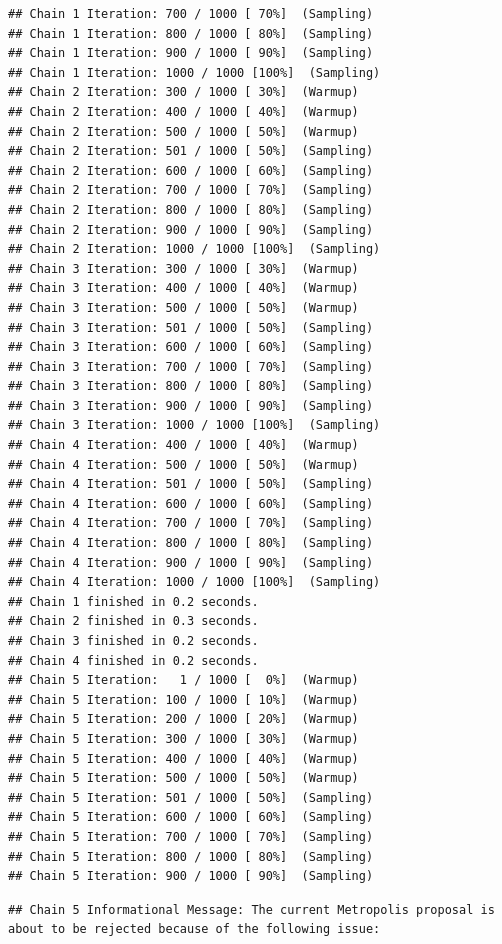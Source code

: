 \documentclass[
]{book}
\begin{document}
\begin{verbatim}
## Chain 1 Iteration: 700 / 1000 [ 70%]  (Sampling) 
## Chain 1 Iteration: 800 / 1000 [ 80%]  (Sampling) 
## Chain 1 Iteration: 900 / 1000 [ 90%]  (Sampling) 
## Chain 1 Iteration: 1000 / 1000 [100%]  (Sampling) 
## Chain 2 Iteration: 300 / 1000 [ 30%]  (Warmup) 
## Chain 2 Iteration: 400 / 1000 [ 40%]  (Warmup) 
## Chain 2 Iteration: 500 / 1000 [ 50%]  (Warmup) 
## Chain 2 Iteration: 501 / 1000 [ 50%]  (Sampling) 
## Chain 2 Iteration: 600 / 1000 [ 60%]  (Sampling) 
## Chain 2 Iteration: 700 / 1000 [ 70%]  (Sampling) 
## Chain 2 Iteration: 800 / 1000 [ 80%]  (Sampling) 
## Chain 2 Iteration: 900 / 1000 [ 90%]  (Sampling) 
## Chain 2 Iteration: 1000 / 1000 [100%]  (Sampling) 
## Chain 3 Iteration: 300 / 1000 [ 30%]  (Warmup) 
## Chain 3 Iteration: 400 / 1000 [ 40%]  (Warmup) 
## Chain 3 Iteration: 500 / 1000 [ 50%]  (Warmup) 
## Chain 3 Iteration: 501 / 1000 [ 50%]  (Sampling) 
## Chain 3 Iteration: 600 / 1000 [ 60%]  (Sampling) 
## Chain 3 Iteration: 700 / 1000 [ 70%]  (Sampling) 
## Chain 3 Iteration: 800 / 1000 [ 80%]  (Sampling) 
## Chain 3 Iteration: 900 / 1000 [ 90%]  (Sampling) 
## Chain 3 Iteration: 1000 / 1000 [100%]  (Sampling) 
## Chain 4 Iteration: 400 / 1000 [ 40%]  (Warmup) 
## Chain 4 Iteration: 500 / 1000 [ 50%]  (Warmup) 
## Chain 4 Iteration: 501 / 1000 [ 50%]  (Sampling) 
## Chain 4 Iteration: 600 / 1000 [ 60%]  (Sampling) 
## Chain 4 Iteration: 700 / 1000 [ 70%]  (Sampling) 
## Chain 4 Iteration: 800 / 1000 [ 80%]  (Sampling) 
## Chain 4 Iteration: 900 / 1000 [ 90%]  (Sampling) 
## Chain 4 Iteration: 1000 / 1000 [100%]  (Sampling) 
## Chain 1 finished in 0.2 seconds.
## Chain 2 finished in 0.3 seconds.
## Chain 3 finished in 0.2 seconds.
## Chain 4 finished in 0.2 seconds.
## Chain 5 Iteration:   1 / 1000 [  0%]  (Warmup) 
## Chain 5 Iteration: 100 / 1000 [ 10%]  (Warmup) 
## Chain 5 Iteration: 200 / 1000 [ 20%]  (Warmup) 
## Chain 5 Iteration: 300 / 1000 [ 30%]  (Warmup) 
## Chain 5 Iteration: 400 / 1000 [ 40%]  (Warmup) 
## Chain 5 Iteration: 500 / 1000 [ 50%]  (Warmup) 
## Chain 5 Iteration: 501 / 1000 [ 50%]  (Sampling) 
## Chain 5 Iteration: 600 / 1000 [ 60%]  (Sampling) 
## Chain 5 Iteration: 700 / 1000 [ 70%]  (Sampling) 
## Chain 5 Iteration: 800 / 1000 [ 80%]  (Sampling) 
## Chain 5 Iteration: 900 / 1000 [ 90%]  (Sampling)
\end{verbatim}

\begin{verbatim}
## Chain 5 Informational Message: The current Metropolis proposal is about to be rejected because of the following issue:
\end{verbatim}
\end{document}
